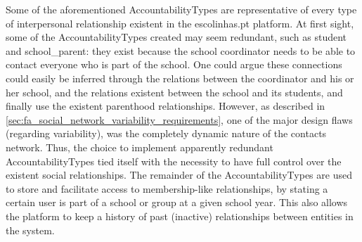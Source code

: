 
Some of the aforementioned AccountabilityTypes are representative of every type of interpersonal relationship existent in the escolinhas.pt platform. At first sight, some of the AccountabilityTypes created may seem redundant, such as student and school\_parent: they exist because the school coordinator needs to be able to contact everyone who is part of the school. One could argue these connections could easily be inferred through the relations between the coordinator and his or her school, and the relations existent between the school and its students, and finally use the existent parenthood relationships. However, as described in \ref{sec:fa_social_network_variability_requirements}, one of the major design flaws (regarding variability), was the completely dynamic nature of the contacts network. Thus, the choice to implement apparently redundant AccountabilityTypes tied itself with the necessity to have full control over the existent social relationships. The remainder of the AccountabilityTypes are used to store and facilitate access to membership-like relationships, by stating a certain user is part of a school or group at a given school year. This also allows the platform to keep a history of past (inactive) relationships between entities in the system.

